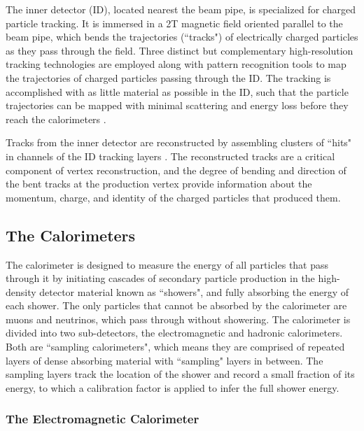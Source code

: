 The inner detector (ID), located nearest the beam pipe, is specialized for charged particle tracking. It is immersed in a 2T magnetic field oriented parallel to the beam pipe, which bends the trajectories (``tracks") of electrically charged particles as they pass through the field. Three distinct but complementary high-resolution tracking technologies are employed along with pattern recognition tools to map the trajectories of charged particles passing through the ID. The tracking is accomplished with as little material as possible in the ID, such that the particle trajectories can be mapped with minimal scattering and energy loss before they reach the calorimeters \cite{id_thesis}. 

Tracks from the inner detector are reconstructed by assembling clusters of ``hits" in channels of the ID tracking layers \cite{electron_reco}. The reconstructed tracks are a critical component of vertex reconstruction, and the degree of bending and direction of the bent tracks at the production vertex provide information about the momentum, charge, and identity of the charged particles that produced them. 


\subsection{The Calorimeters}

The calorimeter is designed to measure the energy of all particles that pass through it by initiating cascades of secondary particle production in the high-density detector material known as ``showers", and fully absorbing the energy of each shower. The only particles that cannot be absorbed by the calorimeter are muons and neutrinos, which pass through without showering. The calorimeter is divided into two sub-detectors, the electromagnetic and hadronic calorimeters. Both are ``sampling calorimeters", which means they are comprised of repeated layers of dense absorbing material with ``sampling" layers in between. The sampling layers track the location of the shower and record a small fraction of its energy, to which a calibration factor is applied to infer the full shower energy. 

\subsubsection{The Electromagnetic Calorimeter}
\label{sec:EM_calo}

